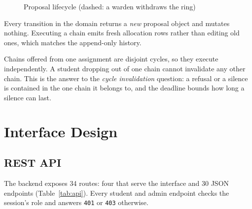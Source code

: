 \begin{figure}[H]
\centering
{}
\caption{Proposal lifecycle (dashed: a warden withdraws the ring)}
\label{fig:proposal-states}
\end{figure}

Every transition in the domain returns a \emph{new} proposal object and
mutates nothing. Executing a chain emits fresh allocation rows rather
than editing old ones, which matches the append-only history.

Chains offered from one assignment are disjoint cycles, so they execute
independently. A student dropping out of one chain cannot invalidate any
other chain. This is the answer to the \emph{cycle invalidation}
question: a refusal or a silence is contained in the one chain it
belongs to, and the deadline bounds how long a silence can last.

\section{Interface Design}

\subsection{REST API}

The backend exposes 34 routes: four that serve the interface and 30 JSON
endpoints (Table~\ref{tab:api}). Every student and admin endpoint checks
the session's role and answers \texttt{401} or \texttt{403} otherwise.

